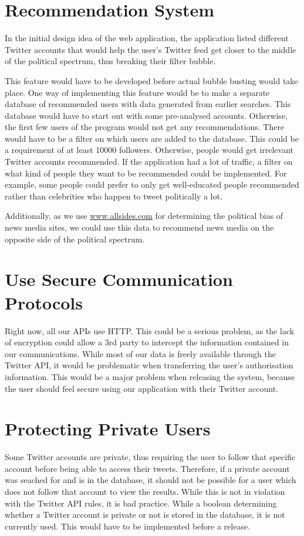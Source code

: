 \section*{Recommendation System}
In the initial design idea of the web application, the application listed
different Twitter accounts that would help the user's Twitter feed get closer to
the middle of the political spectrum, thus breaking their filter bubble. \nl

This feature would have to be developed before actual bubble busting would take
place. One way of implementing this feature would be to make a separate
database of recommended users with data generated from earlier searches. This
database would have to start out with some pre-analysed accounts.
Otherwise, the first few users of the program would not get any
recommendations. There would have to be a filter on which users are added to
the database. This could be a requirement of at least 10000 followers.
Otherwise, people would get irrelevant Twitter accounts recommended. If the
application had a lot of traffic, a filter on what kind of people they want to
be recommended could be implemented. For example, some people could prefer to
only get well-educated people recommended rather than celebrities who happen to
tweet politically a lot.\nl

Additionally, as we use \url{www.allsides.com} for determining the
political bias of news media sites, we could use this data to recommend news
media on the opposite side of the political spectrum.


\section*{Use Secure Communication Protocols}
Right now, all our \ac{API}s use HTTP. This could be a serious problem, as the
lack of encryption could allow a 3rd party to intercept the information
contained in our communications. While most of our data is freely available
through the Twitter API, it would be problematic when transferring the user's
authorisation information. This would be a major problem when releasing the
system, because the user should feel secure using our application with their
Twitter account.


\section*{Protecting Private Users}\label{sec:twitterProtect}
Some Twitter accounts are private, thus requiring the user to follow that
specific account before being able to access their tweets. Therefore, if a
private account was seached for and is in the database, it should not be
possible for a user which does not follow that account to view the results.
While this is not in violation with the Twitter API rules, it is bad practice.
While a boolean determining whether a Twitter account is private or not is stored in the
database, it is not currently used. This would have to be implemented before a
release.

